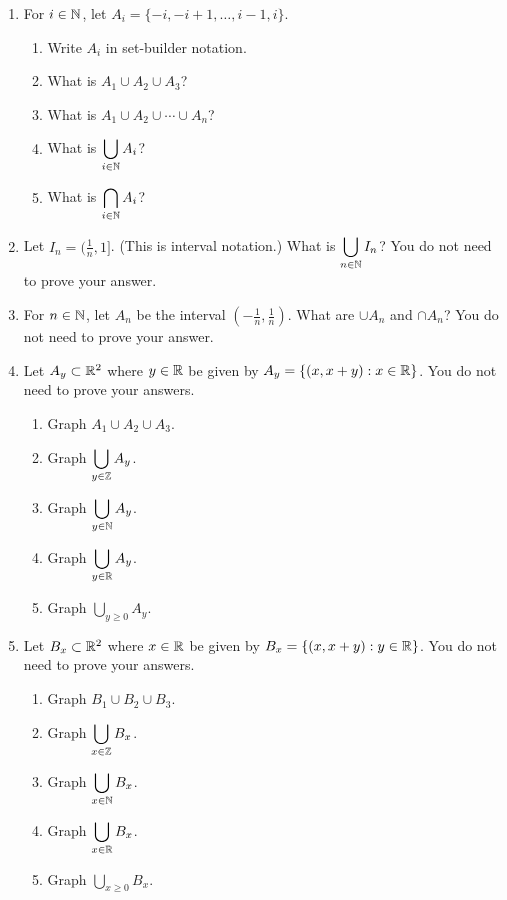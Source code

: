 \probsec{~\ref{sec:indexed-sets}}
\begin{enumerate}
    \item For $i \in \mathbb{N}$, let $A_i = \{-i, -i+1, \dots, i-1, i\}$.
  \begin{enumerate}
      \item Write $A_i$ in set-builder notation.
      \item What is $A_1 \cup A_2 \cup A_3$?
      \item What is $A_1 \cup A_2 \cup \cdots \cup A_{n}$?
      \item What is $\displaystyle\bigcup_{i \in \mathbb{N}} A_i$?
      \item What is $\displaystyle\bigcap_{i\in\mathbb{N}} A_i$?
  \end{enumerate}

    \item Let $I_n = (\frac{1}{n}, 1]$. (This is interval notation.) What is $\displaystyle\bigcup_{n \in \mathbb{N}} I_n$? You do not need to prove your answer.

    \item For $n \in \mathbb{N}$, let $A_n$ be the interval $(-\frac{1}{n}, \frac{1}{n})$. What are $\cup A_n$ and $\cap A_n$? You do not need to prove your answer.

    \item Let $A_y \subset \mathbb{R}^2$ where $y \in \mathbb{R}$ be given by $A_y = \{(x, x+y): x \in \mathbb{R}\}$. You do not need to prove your answers.
  \begin{enumerate}
      \item Graph $A_1 \cup A_2 \cup A_3$.
      \item Graph $\displaystyle\bigcup_{y \in \mathbb{Z}} A_y$.
      \item Graph $\displaystyle\bigcup_{y \in \mathbb{N}} A_y$.
      \item Graph $\displaystyle\bigcup_{y \in \mathbb{R}} A_y$.
      \item Graph $\displaystyle\bigcup_{y \geq 0} A_y$.
  \end{enumerate}

    \item Let $B_x \subset \mathbb{R}^2$ where $x \in \mathbb{R}$ be given by $B_x = \{(x, x+y): y \in \mathbb{R}\}$. You do not need to prove your answers.
  \begin{enumerate}
      \item Graph $B_1 \cup B_2 \cup B_3$.
      \item Graph $\displaystyle\bigcup_{x \in \mathbb{Z}} B_x$.
      \item Graph $\displaystyle\bigcup_{x\in \mathbb{N}} B_x$.
      \item Graph $\displaystyle\bigcup_{x \in \mathbb{R}} B_x$.
      \item Graph $\displaystyle\bigcup_{x \geq 0} B_x$.
  \end{enumerate}


\end{enumerate}
